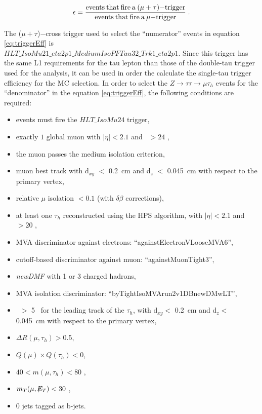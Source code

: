 \begin{equation}\label{eq:triggerEff}
\epsilon = \frac{\rm{events\>that\>fire\>a\>}(\mu+\tau)\rm{-trigger}}{\rm{events\>that\>fire\>a\>}\mu\rm{-trigger}}\; . \\
\end{equation}

\noindent The ($\mu+\tau$)$-$cross trigger used to select the ``numerator'' events in equation \ref{eq:triggerEff} is \\
$HLT\_IsoMu21\_eta2p1\_MediumIsoPFTau32\_Trk1\_eta2p1$. Since this trigger has the same L1 requirements 
for the tau lepton than those of the double-tau trigger used for the analysis, it can be used 
in order the calculate the single-tau trigger efficiency for the MC selection. In order to 
select the $Z \rightarrow \tau\tau \rightarrow \mu\tau_{h}$ events for the ``denominator'' 
in the equation \ref{eq:triggerEff}, the following conditions are required:

\begin{itemize}
  \item events must fire the $HLT{\_}IsoMu24$ trigger,
  \item exactly $1$ global muon with $|\eta| < 2.1$ and \pt~$> 24$ \GeV,
  \item the muon passes the medium isolation criterion,
  \item muon best track with d$_{xy}$ $<$ 0.2~cm and d$_{z}$ $<$ 0.045~cm with respect to the primary vertex,
  \item relative $\mu$ isolation $< 0.1$ (with $\delta\beta$ corrections),
  \item at least one $\tau_{h}$ reconstructed using the HPS algorithm, with $|\eta| < 2.1$ and \pt~$> 20$ \GeV,
  \item MVA discriminator against electrons: ``againstElectronVLooseMVA6'',
  \item cutoff-based discriminator against muon: ``againstMuonTight3'',
   \item \textit{newDMF} with 1 or 3 charged hadrons, %
  \item MVA isolation discriminator: ``byTightIsoMVArun2v1DBnewDMwLT'',
  \item \pt~$>$ 5 \GeV~for the leading track of the $\tau_{h}$, with d$_{xy} <$ 0.2~cm 
  and d$_{z} <$ 0.045~cm with respect to the primary vertex,
  \item $\Delta R(\mu,\tau_{h}) > 0.5$,
  \item $Q(\mu) \times Q(\tau_{h}) < 0 $,
  \item $40 < m(\mu, \tau_{h}) < 80$ \GeV,
  \item $m_{T}(\mu,\not\!\!E_T) < 30$ \GeV,
  \item 0 jets tagged as b-jets.
\end{itemize}

